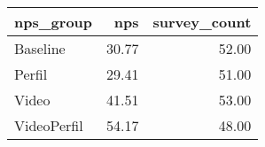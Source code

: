 \begin{tabular}{lrr}
  \hline
nps\_group & nps & survey\_count \\ 
  \hline
Baseline & 30.77 & 52.00 \\ 
  Perfil & 29.41 & 51.00 \\ 
  Video & 41.51 & 53.00 \\ 
  VideoPerfil & 54.17 & 48.00 \\ 
   \hline
\end{tabular}
